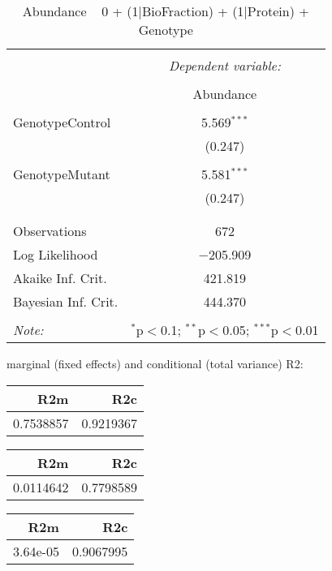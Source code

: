 \documentclass[11pt]{report}
\begin{document}
\begin{table}[!htbp] \centering 
  \caption{Abundance ~ 0 + (1|BioFraction) + (1|Protein) + Genotype} 
  \label{} 
\begin{tabular}{@{\extracolsep{5pt}}lc} 
\\[-1.8ex]\hline 
\hline \\[-1.8ex] 
 & \multicolumn{1}{c}{\textit{Dependent variable:}} \\ 
\cline{2-2} 
\\[-1.8ex] & Abundance \\ 
\hline \\[-1.8ex] 
 GenotypeControl & 5.569$^{***}$ \\ 
  & (0.247) \\ 
  & \\ 
 GenotypeMutant & 5.581$^{***}$ \\ 
  & (0.247) \\ 
  & \\ 
\hline \\[-1.8ex] 
Observations & 672 \\ 
Log Likelihood & $-$205.909 \\ 
Akaike Inf. Crit. & 421.819 \\ 
Bayesian Inf. Crit. & 444.370 \\ 
\hline 
\hline \\[-1.8ex] 
\textit{Note:}  & \multicolumn{1}{r}{$^{*}$p$<$0.1; $^{**}$p$<$0.05; $^{***}$p$<$0.01} \\ 
\end{tabular} 
\end{table} 
marginal (fixed effects) and conditional (total variance) R2:

\begin{tabular}{r|r}
\hline
R2m & R2c\\
\hline
0.7538857 & 0.9219367\\
\hline
\end{tabular}

\begin{tabular}{r|r}
\hline
R2m & R2c\\
\hline
0.0114642 & 0.7798589\\
\hline
\end{tabular}

\begin{tabular}{r|r}
\hline
R2m & R2c\\
\hline
3.64e-05 & 0.9067995\\
\hline
\end{tabular}
\end{document}
